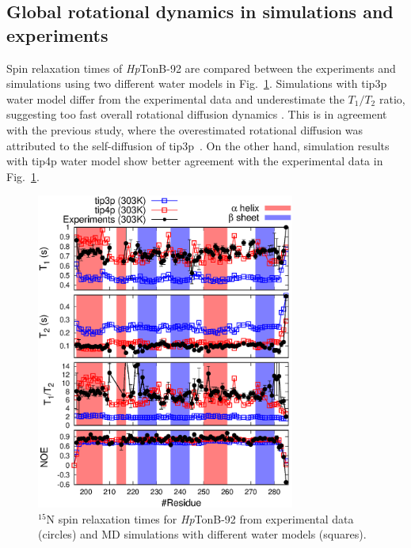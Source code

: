 \documentclass[journal=jpcbfk,manuscript=article]{achemso}
\begin{document}
\subsection{Global rotational dynamics in simulations and experiments}
Spin relaxation times of {\it Hp}TonB-92 are compared 
between the experiments and simulations using two
different water models in Fig.~\ref{HpTonBrelaxationDATA}.
Simulations with tip3p water model differ
from the experimental data and underestimate the $T_1/T_2$ ratio, suggesting too
fast overall rotational diffusion dynamics \cite{carper97}.
This is in agreement with the previous study, where the overestimated
rotational diffusion was attributed to the self-diffusion of tip3p~\cite{wong08}.
On the other hand, simulation results with tip4p water model show 
better agreement with the experimental data in  Fig.~\ref{HpTonBrelaxationDATA}.
\begin{figure}[!h]
  \includegraphics[width=8.5cm]{../Figs/HpTonBrelaxationDATA.eps}%
  \caption{$^{15}$N spin relaxation times for {\it Hp}TonB-92 from experimental data (circles)
    and MD simulations with different water models (squares).
    \label{HpTonBrelaxationDATA}}%
\end{figure}
\end{document}
